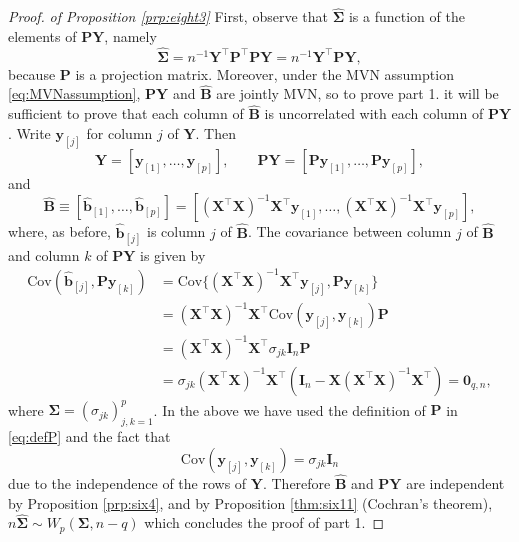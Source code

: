 \documentclass[]{book}
\theoremstyle{definition}
\theoremstyle{definition}
\theoremstyle{definition}
\theoremstyle{remark}
\begin{document}
\begin{proof}
{}\emph{of Proposition \ref{prp:eight3}}
First, observe that \(\hat{\boldsymbol \Sigma}\) is a function of the elements of \(\boldsymbol P\boldsymbol Y\), namely
\[
\hat{\boldsymbol \Sigma}=n^{-1} \boldsymbol Y^\top \boldsymbol P^\top \boldsymbol P\boldsymbol Y=n^{-1}\boldsymbol Y^\top \boldsymbol P\boldsymbol Y,
\]
because \(\boldsymbol P\) is a projection matrix. Moreover, under the MVN assumption \eqref{eq:MVNassumption}, \(\boldsymbol P\boldsymbol Y\) and
\(\hat{\boldsymbol B}\) are jointly MVN, so to prove part 1. it will be sufficient to prove that each column of \(\hat{\boldsymbol B}\) is uncorrelated with
each column of \(\boldsymbol P\boldsymbol Y\). Write \(\boldsymbol y_{[j]}\) for column \(j\) of \(\boldsymbol Y\). Then
\[
\boldsymbol Y=[\boldsymbol y_{[1]}, \ldots , \boldsymbol y_{[p]}], \qquad \boldsymbol P\boldsymbol Y=[\boldsymbol P\boldsymbol y_{[1]}, \ldots , \boldsymbol P\boldsymbol y_{[p]}],
\]
and
\[
\hat{\boldsymbol B}\equiv [\hat{\boldsymbol b}_{[1]}, \ldots , \hat{\boldsymbol b}_{[p]}] =[(\boldsymbol X^\top \boldsymbol X)^{-1}\boldsymbol X^\top \boldsymbol y_{[1]}, \ldots , (\boldsymbol X^\top \boldsymbol X)^{-1}\boldsymbol X^\top \boldsymbol y_{[p]}],
\]
where, as before, \(\hat{\boldsymbol b}_{[j]}\) is column \(j\) of \(\hat{\boldsymbol B}\). The covariance between column \(j\) of \(\hat{\boldsymbol B}\) and column \(k\) of \(\boldsymbol P\boldsymbol Y\) is given by
\begin{align*}
\text{Cov}(\hat{\boldsymbol b}_{[j]}, \boldsymbol P\boldsymbol y_{[k]})&= \text{Cov}\{(\boldsymbol X^\top \boldsymbol X)^{-1}\boldsymbol X^\top \boldsymbol y_{[j]}, \boldsymbol P\boldsymbol y_{[k]}\}\\
&=(\boldsymbol X^\top \boldsymbol X)^{-1} \boldsymbol X^\top \text{Cov}(\boldsymbol y_{[j]}, \boldsymbol y_{[k]})\boldsymbol P\\
&=(\boldsymbol X^\top \boldsymbol X)^{-1} \boldsymbol X^\top \sigma_{jk}\boldsymbol I_n\boldsymbol P\\
&=\sigma_{jk}(\boldsymbol X^\top \boldsymbol X)^{-1} \boldsymbol X^\top (\boldsymbol I_n - \boldsymbol X(\boldsymbol X^\top \boldsymbol X)^{-1}\boldsymbol X^\top)={\mathbf 0}_{q,n},
\end{align*}
where \(\boldsymbol \Sigma=(\sigma_{jk})_{j,k=1}^p\). In the above we have used the definition of \(\boldsymbol P\) in \eqref{eq:defP} and the fact that
\begin{equation}
\text{Cov}(\boldsymbol y_{[j]}, \boldsymbol y_{[k]})=\sigma_{jk}\boldsymbol I_n
\label{eq:energise}
\end{equation}
due to the independence of the rows of \(\boldsymbol Y\). Therefore \(\hat{\boldsymbol B}\) and \(\boldsymbol P\boldsymbol Y\) are independent by Proposition \ref{prp:six4}, and
by Proposition \ref{thm:six11} (Cochran's theorem), \(n\hat{\boldsymbol \Sigma} \sim W_p(\boldsymbol \Sigma, n-q)\) which concludes the proof of part 1.


\end{proof}
\end{document}
